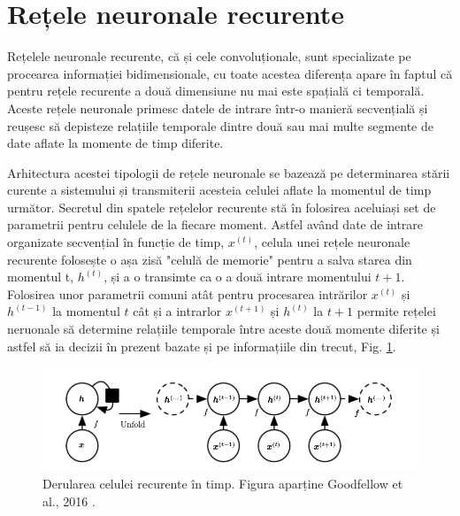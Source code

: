 \documentclass[a4paper,12pt]{book}
\begin{document}
			\section{Rețele neuronale recurente} \label{RNN}
				
				Rețelele neuronale recurente, că și cele convoluționale, sunt specializate pe procearea informației bidimensionale, cu toate acestea diferența apare în faptul că pentru rețele recurente a două dimensiune nu mai este spațială ci temporală. Aceste rețele neuronale primesc datele de intrare într-o manieră secvențială și reușesc să depisteze relațiile temporale dintre două sau mai multe segmente de date aflate la momente de timp diferite. \par
				
				Arhitectura acestei tipologii de rețele neuronale se bazează pe determinarea stării curente a sistemului și transmiterii acesteia celulei aflate la momentul de timp următor. Secretul din spatele rețelelor recurente stă în folosirea aceluiași set de parametrii pentru celulele de la fiecare moment. Astfel având date de intrare organizate secvențial în funcție de timp, $x^{(t)}$, celula unei rețele neuronale recurente folosește o așa zisă "celulă de memorie" pentru a salva starea din momentul t, $h^{(t)}$, și a o transimte ca o a două intrare momentului $t+1$. Folosirea unor parametrii comuni atât pentru procesarea intrărilor $x^{(t)}$ și $h^{(t-1)}$ la momentul $t$ cât și a intrarlor $x^{(t+1)}$ și $h^{(t)}$ la $t+1$ permite rețelei neruonale să determine relațiile temporale între aceste două momente diferite și astfel să ia decizii în prezent bazate și pe informațiile din trecut, Fig. \ref{fig:unfolding}. 
				
				\begin{figure}[h]
					\centering
					\includegraphics[scale=0.45]{unfolding}
					\caption{Derularea celulei recurente în timp. Figura aparține Goodfellow et al., 2016 \cite{dpb}.}
					\label{fig:unfolding}
				\end{figure}
				
\end{document}

